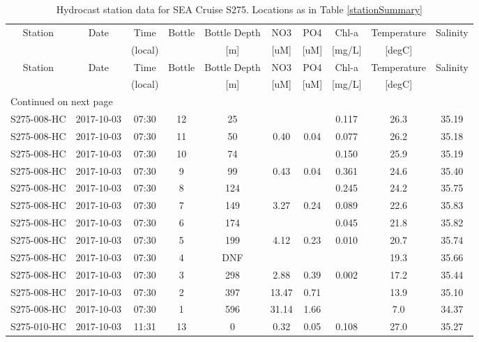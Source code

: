 \begin{longtable}{cccccccccc}
\caption{\label{hydrowork} Hydrocast station data for SEA Cruise S275. Locations as in Table \ref{stationSummary}} \\ 
 Station & Date & Time & Bottle & Bottle Depth & NO3 & PO4 & Chl-a & Temperature & Salinity \\ 
   &  & (local) &  & [m] & [uM] & [uM] & [mg/L] & [degC] &  \\ 
\hline\n\endfirsthead
Station & Date & Time & Bottle & Bottle Depth & NO3 & PO4 & Chl-a & Temperature & Salinity \\ 
 &  & (local) &  & [m] & [uM] & [uM] & [mg/L] & [degC] &  \\ 
\hline
\endhead
\hline
\multicolumn{10}{l}{\footnotesize Continued on next page}
\endfoot
\endlastfoot
 \hline
S275-008-HC & 2017-10-03 & 07:30 & 13 & 0 & 0.33 & 0.23 & 0.083 & 26.9 & 35.26 \\ 
  S275-008-HC & 2017-10-03 & 07:30 & 12 & 25 &  &  & 0.117 & 26.3 & 35.19 \\ 
  S275-008-HC & 2017-10-03 & 07:30 & 11 & 50 & 0.40 & 0.04 & 0.077 & 26.2 & 35.18 \\ 
  S275-008-HC & 2017-10-03 & 07:30 & 10 & 74 &  &  & 0.150 & 25.9 & 35.19 \\ 
  S275-008-HC & 2017-10-03 & 07:30 & 9 & 99 & 0.43 & 0.04 & 0.361 & 24.6 & 35.40 \\ 
  S275-008-HC & 2017-10-03 & 07:30 & 8 & 124 &  &  & 0.245 & 24.2 & 35.75 \\ 
  S275-008-HC & 2017-10-03 & 07:30 & 7 & 149 & 3.27 & 0.24 & 0.089 & 22.6 & 35.83 \\ 
  S275-008-HC & 2017-10-03 & 07:30 & 6 & 174 &  &  & 0.045 & 21.8 & 35.82 \\ 
  S275-008-HC & 2017-10-03 & 07:30 & 5 & 199 & 4.12 & 0.23 & 0.010 & 20.7 & 35.74 \\ 
  S275-008-HC & 2017-10-03 & 07:30 & 4 & DNF &  &  &  & 19.3 & 35.66 \\ 
  S275-008-HC & 2017-10-03 & 07:30 & 3 & 298 & 2.88 & 0.39 & 0.002 & 17.2 & 35.44 \\ 
  S275-008-HC & 2017-10-03 & 07:30 & 2 & 397 & 13.47 & 0.71 &  & 13.9 & 35.10 \\ 
  S275-008-HC & 2017-10-03 & 07:30 & 1 & 596 & 31.14 & 1.66 &  & 7.0 & 34.37 \\ 
  S275-010-HC & 2017-10-03 & 11:31 & 13 & 0 & 0.32 & 0.05 & 0.108 & 27.0 & 35.27 \\ 

\end{longtable}
